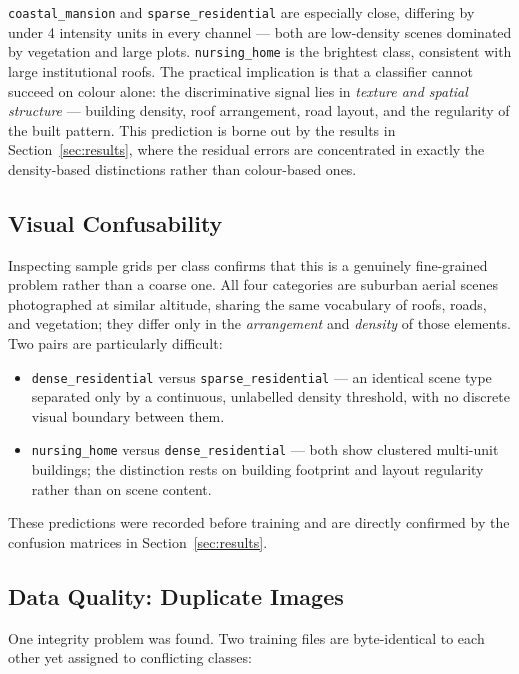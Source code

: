 \documentclass[11pt,twoside,a4paper]{article}
\begin{document}
\texttt{coastal\_mansion} and \texttt{sparse\_residential} are especially
close, differing by under 4 intensity units in every channel --- both are
low-density scenes dominated by vegetation and large plots.
\texttt{nursing\_home} is the brightest class, consistent with large
institutional roofs. The practical implication is that a classifier cannot
succeed on colour alone: the discriminative signal lies in \emph{texture and
spatial structure} --- building density, roof arrangement, road layout, and the
regularity of the built pattern. This prediction is borne out by the results in
Section~\ref{sec:results}, where the residual errors are concentrated in
exactly the density-based distinctions rather than colour-based ones.

\subsection{Visual Confusability}

Inspecting sample grids per class confirms that this is a genuinely
fine-grained problem rather than a coarse one. All four categories are
suburban aerial scenes photographed at similar altitude, sharing the same
vocabulary of roofs, roads, and vegetation; they differ only in the
\emph{arrangement} and \emph{density} of those elements. Two pairs are
particularly difficult:

\begin{itemize}
  \item \texttt{dense\_residential} versus \texttt{sparse\_residential} --- an
    identical scene type separated only by a continuous, unlabelled density
    threshold, with no discrete visual boundary between them.
  \item \texttt{nursing\_home} versus \texttt{dense\_residential} --- both show
    clustered multi-unit buildings; the distinction rests on building
    footprint and layout regularity rather than on scene content.
\end{itemize}

These predictions were recorded before training and are directly confirmed by
the confusion matrices in Section~\ref{sec:results}.

\subsection{Data Quality: Duplicate Images}

One integrity problem was found. Two training files are byte-identical to each
other yet assigned to conflicting classes:
\end{document}
